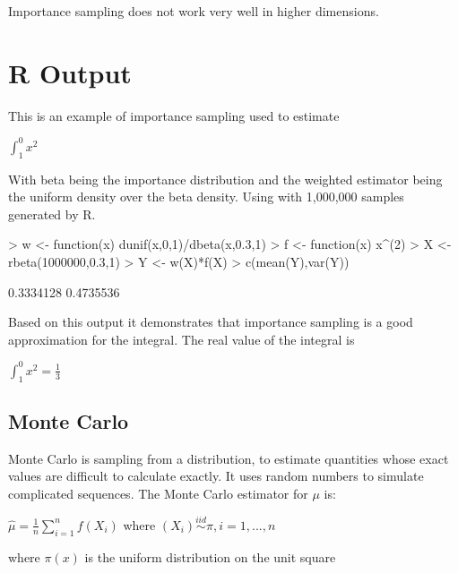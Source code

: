 \documentclass[11pt,a4paper]{article}
\theoremstyle{plain}
\begin{document}
Importance sampling does not work very well in higher dimensions.
\newpage
\section*{R Output}
This is an example of importance sampling used to estimate 
\begin{center}$\displaystyle\int^0_1 x^2$ 
\end{center}
With beta being the importance distribution and the weighted estimator being the uniform density over the beta density. Using with 1,000,000 samples generated by R.
\begin{Schunk}
\begin{Sinput}
> w <- function(x) dunif(x,0,1)/dbeta(x,0.3,1)
> f <- function(x) x^(2)
> X <- rbeta(1000000,0.3,1)
> Y <- w(X)*f(X)
> c(mean(Y),var(Y))
\end{Sinput}
\begin{Soutput}
[1] 0.3334128 0.4735536
\end{Soutput}
\end{Schunk}

Based on this output it demonstrates that importance sampling is a good approximation for the integral. The real value of the integral is 
\begin{center}$\displaystyle\int^0_1 x^2=\frac{1}{3}$
\end{center}



\newpage


\subsection*{Monte Carlo}
Monte Carlo is sampling from a distribution, to estimate quantities whose exact values are difficult to calculate exactly.
It uses random numbers to simulate complicated sequences. The Monte Carlo estimator for $\mu$ is: 
\begin{center}$\hat{\mu}=\frac{1}{n}\sum_{i=1}^n f(X_i)$ where $(X_i)\overset{iid}\sim \pi, i=1,...,n$ 
\end{center}
where $\pi(x)$ is the uniform distribution on the unit square
\end{document}
